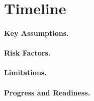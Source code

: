\section{Timeline}
\label{sec:research_plan}

\paragraph{Key Assumptions.}

\paragraph{Risk Factors.}

\paragraph{Limitations.}

\paragraph{Progress and Readiness.}
